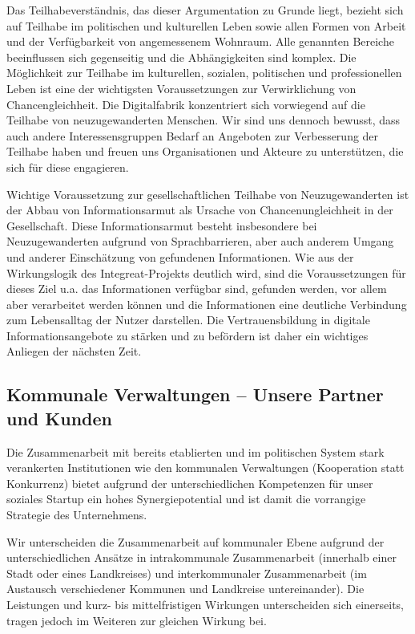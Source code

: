 \documentclass[12pt, a4paper]{article} %
\begin{document}
Das Teilhabeverständnis, das dieser Argumentation zu Grunde liegt,
bezieht sich auf Teilhabe im politischen und kulturellen Leben sowie
allen Formen von Arbeit und der Verfügbarkeit von angemessenem Wohnraum.
Alle genannten Bereiche beeinflussen sich gegenseitig und die
Abhängigkeiten sind komplex. Die Möglichkeit zur Teilhabe im
kulturellen, sozialen, politischen und professionellen Leben ist eine
der wichtigsten Voraussetzungen zur Verwirklichung von
Chancengleichheit. Die Digitalfabrik konzentriert sich vorwiegend auf
die Teilhabe von neuzugewanderten Menschen. Wir sind uns dennoch
bewusst, dass auch andere Interessensgruppen Bedarf an Angeboten zur
Verbesserung der Teilhabe haben und freuen uns Organisationen und
Akteure zu unterstützen, die sich für diese engagieren.

Wichtige Voraussetzung zur gesellschaftlichen Teilhabe von
Neuzugewanderten ist der Abbau von Informationsarmut als Ursache von
Chancenungleichheit in der Gesellschaft. Diese Informationsarmut besteht
insbesondere bei Neuzugewanderten aufgrund von Sprachbarrieren, aber
auch anderem Umgang und anderer Einschätzung von gefundenen
Informationen. Wie aus der Wirkungslogik des Integreat-Projekts deutlich
wird, sind die Voraussetzungen für dieses Ziel u.a. das Informationen
verfügbar sind, gefunden werden, vor allem aber verarbeitet werden
können und die Informationen eine deutliche Verbindung zum Lebensalltag
der Nutzer darstellen. Die Vertrauensbildung in digitale
Informationsangebote zu stärken und zu befördern ist daher ein wichtiges
Anliegen der nächsten Zeit.

\hypertarget{kommunale-verwaltungen-unsere-partner-und-kunden}{%
\subsection{Kommunale Verwaltungen – Unsere Partner und
Kunden}\label{kommunale-verwaltungen-unsere-partner-und-kunden}}

Die Zusammenarbeit mit bereits etablierten und im politischen System
stark verankerten Institutionen wie den kommunalen Verwaltungen
(Kooperation statt Konkurrenz) bietet aufgrund der unterschiedlichen
Kompetenzen für unser soziales Startup ein hohes Synergiepotential und
ist damit die vorrangige Strategie des Unternehmens.

Wir unterscheiden die Zusammenarbeit auf kommunaler Ebene aufgrund der
unterschiedlichen Ansätze in intrakommunale Zusammenarbeit (innerhalb
einer Stadt oder eines Landkreises) und interkommunaler Zusammenarbeit
(im Austausch verschiedener Kommunen und Landkreise untereinander). Die
Leistungen und kurz- bis mittelfristigen Wirkungen unterscheiden sich
einerseits, tragen jedoch im Weiteren zur gleichen Wirkung bei.
\end{document}
